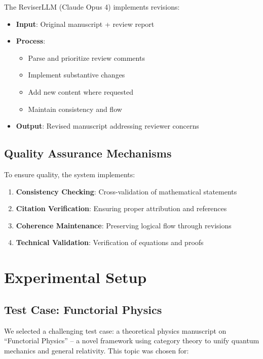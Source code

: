 \documentclass[11pt,a4paper]{article}
\begin{document}
The ReviserLLM (Claude Opus 4) implements revisions:

\begin{itemize}
    \item \textbf{Input}: Original manuscript + review report
    \item \textbf{Process}:
    \begin{itemize}
        \item Parse and prioritize review comments
        \item Implement substantive changes
        \item Add new content where requested
        \item Maintain consistency and flow
    \end{itemize}
    \item \textbf{Output}: Revised manuscript addressing reviewer concerns
\end{itemize}

\subsection{Quality Assurance Mechanisms}

To ensure quality, the system implements:

\begin{enumerate}
    \item \textbf{Consistency Checking}: Cross-validation of mathematical statements
    \item \textbf{Citation Verification}: Ensuring proper attribution and references
    \item \textbf{Coherence Maintenance}: Preserving logical flow through revisions
    \item \textbf{Technical Validation}: Verification of equations and proofs
\end{enumerate}

\section{Experimental Setup}

\subsection{Test Case: Functorial Physics}

We selected a challenging test case: a theoretical physics manuscript on ``Functorial Physics'' -- a novel framework using category theory to unify quantum mechanics and general relativity. This topic was chosen for:
\end{document}
